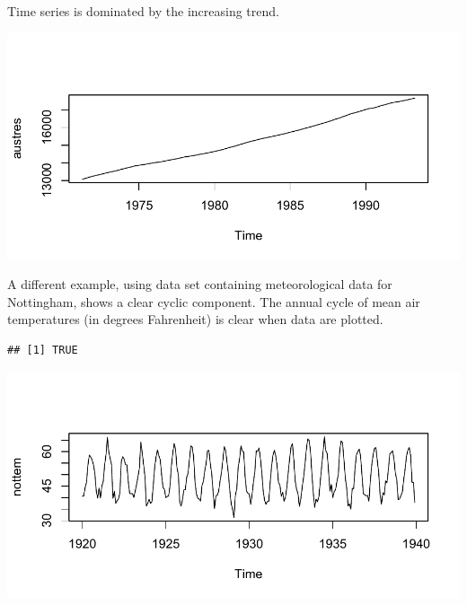 \documentclass[krantz2]{krantz}\usepackage{knitr}
\begin{document}
Time series  is dominated by the increasing trend.

\begin{knitrout}\footnotesize
{}\color{fgcolor}\begin{kframe}
\begin{alltt}
\end{alltt}
\end{kframe}

{\centering \includegraphics[width=.7\textwidth]{figure/pos-ts-02-1}

}



\end{knitrout}

A different example, using data set   containing meteorological data for Nottingham, shows a clear cyclic component. The annual cycle of mean air temperatures (in degrees Fahrenheit) is clear when data are plotted.

\begin{knitrout}\footnotesize
{}\color{fgcolor}\begin{kframe}
\begin{alltt}
\end{alltt}
\begin{verbatim}
## [1] TRUE
\end{verbatim}
\begin{alltt}
\end{alltt}
\end{kframe}

{\centering \includegraphics[width=.7\textwidth]{figure/pos-ts-03-1}

}



\end{knitrout}
\end{document}
